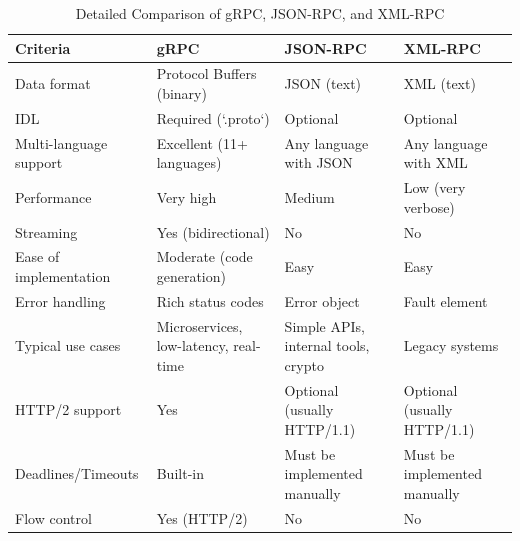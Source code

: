 \documentclass[10pt,a4paper]{article}
\begin{document}
\begin{table}[H]
\centering
\caption{Detailed Comparison of gRPC, JSON-RPC, and XML-RPC}
\label{tab:comparison}
\begin{tabular}{|p{2.8cm}|p{3cm}|p{3cm}|p{3cm}|}
\hline
\textbf{Criteria} & \textbf{gRPC} & \textbf{JSON-RPC} & \textbf{XML-RPC} \\
\hline
Data format & Protocol Buffers (binary) & JSON (text) & XML (text) \\
IDL & Required (`.proto`) & Optional & Optional \\
Multi-language support & Excellent (11+ languages) & Any language with JSON & Any language with XML \\
Performance & Very high & Medium & Low (very verbose) \\
Streaming & Yes (bidirectional) & No & No \\
Ease of implementation & Moderate (code generation) & Easy & Easy \\
Error handling & Rich status codes & Error object & Fault element \\
Typical use cases & Microservices, low-latency, real-time & Simple APIs, internal tools, crypto & Legacy systems \\
HTTP/2 support & Yes & Optional (usually HTTP/1.1) & Optional (usually HTTP/1.1) \\
Deadlines/Timeouts & Built-in & Must be implemented manually & Must be implemented manually \\
Flow control & Yes (HTTP/2) & No & No \\
\hline
\end{tabular}
\end{table}
\end{document}
